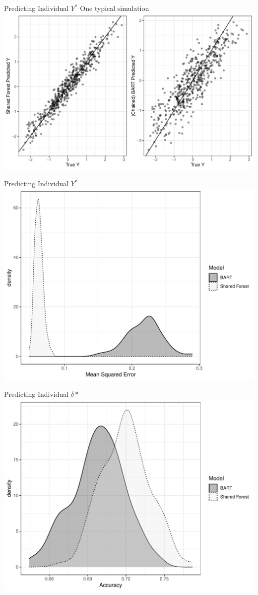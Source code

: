 \documentclass{beamer}
\begin{document}
\begin{frame}{Predicting Individual $Y^*$ }{One typical simulation}
\includegraphics[width = .9\linewidth]{continuous_sim_results_single_sim.pdf}
\end{frame}

\begin{frame}{Predicting Individual $Y^*$ }
\includegraphics[width = .9\linewidth]{continuous_sim_results_ind_y.pdf}
\end{frame}


\begin{frame}{Predicting Individual $\delta*$}
\includegraphics[width = .9\linewidth]{continuous_sim_results_ind_delta.pdf}
\end{frame}
\end{document}
